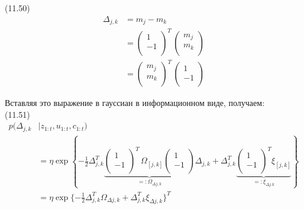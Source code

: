 \documentclass[10pt,a4paper]{article}
\begin{document}
(11.50)
\begin{equation*}
\begin{split}
\varDelta_{j,k}&=m_j-m_k\\
&=\left(\begin{array}{c}1\\
-1\\
\end{array} \right)^T\,\left(\begin{array}{c}m_j\\
m_k\\
\end{array} \right)\\
&=\left(\begin{array}{c}m_j\\
m_k\\
\end{array} \right)^T\,\left(\begin{array}{c}1\\
-1\\
\end{array} \right)
\end{split}
\end{equation*}

Вставляя это выражение в гауссиан в информационном виде, получаем:\\

(11.51)
\begin{equation*}
\begin{split}
p(\varDelta_{j,k}&|z_{1:t},u_{1:t},c_{1:t})\\
&=\eta\exp\left\lbrace -\frac{1}{2}\varDelta_{j,k}^T\underbrace{\left(\begin{array}{c}1\\
-1\\
\end{array} \right)^T\,\varOmega_{[j,k]}\left(\begin{array}{c}1\\
-1\\
\end{array} \right)}_{=:\varOmega_{\varDelta j,k}}\varDelta_{j,k}+\varDelta_{j,k}^T\underbrace{\left(\begin{array}{c}1\\
-1\\
\end{array} \right)^T\xi_{[j,k]}}_{=:\xi_{\varDelta j.k}}\right\rbrace \\
&=\eta\exp\{ -\frac{1}{2}\varDelta_{j,k}^T\varOmega_{\varDelta j,k}+\varDelta_{j,k}^T\xi_{\varDelta j,k}\}^T
\end{split}
\end{equation*}
\end{document}
